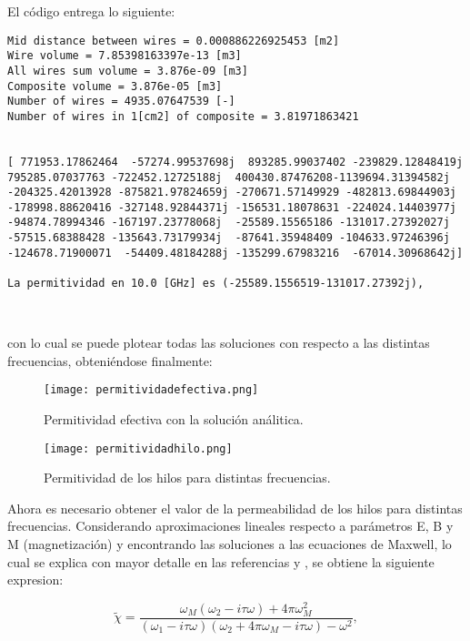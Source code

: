 \documentclass[12pt,letterpaper]{report}
\numberwithin{equation}{section}
\begin{document}
El código entrega lo siguiente:

\begin{lstlisting}
Mid distance between wires = 0.000886226925453 [m2]
Wire volume = 7.85398163397e-13 [m3]
All wires sum volume = 3.876e-09 [m3]
Composite volume = 3.876e-05 [m3]
Number of wires = 4935.07647539 [-]
Number of wires in 1[cm2] of composite = 3.81971863421


[ 771953.17862464  -57274.99537698j  893285.99037402 -239829.12848419j
795285.07037763 -722452.12725188j  400430.87476208-1139694.31394582j
-204325.42013928 -875821.97824659j -270671.57149929 -482813.69844903j
-178998.88620416 -327148.92844371j -156531.18078631 -224024.14403977j
-94874.78994346 -167197.23778068j  -25589.15565186 -131017.27392027j
-57515.68388428 -135643.73179934j  -87641.35948409 -104633.97246396j
-124678.71900071  -54409.48184288j -135299.67983216  -67014.30968642j]

La permitividad en 10.0 [GHz] es (-25589.1556519-131017.27392j),



\end{lstlisting}

\noindent con lo cual se puede plotear todas las soluciones con respecto a las distintas frecuencias, obteniéndose finalmente:

\begin{figure}[H]
	\centering\texttt{[image: permitividadefectiva.png]}\\
	\caption{Permitividad efectiva con la solución análitica.}
	\label{fig:permitividadefectiva}
\end{figure} 



\begin{figure}[H]
	\centering\texttt{[image: permitividadhilo.png]}\\
	\caption{Permitividad de los hilos para distintas frecuencias.}
	\label{fig:permitividadhilo}
\end{figure} 

Ahora es necesario obtener el valor de la permeabilidad de los hilos para distintas frecuencias. Considerando aproximaciones lineales respecto a parámetros E, B y M (magnetización) y encontrando las soluciones a las ecuaciones de Maxwell, lo cual se explica con mayor detalle en las referencias \cite{Wire_theory_2} y \cite{Wire_theory_1}, se obtiene la siguiente expresion:

\begin{equation}
	\tilde{\chi}=\frac{\omega_M(\omega_2-i\tau\omega)+4\pi\omega^2_M}{(\omega_1-i\tau\omega)(\omega_2+4\pi\omega_M-i\tau\omega)-\omega^2},
\end{equation}
\end{document}
